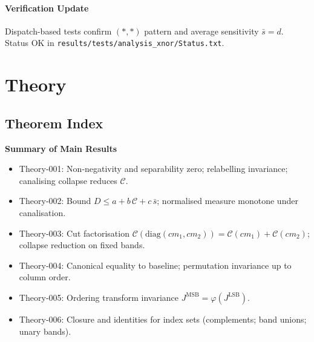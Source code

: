 \documentclass{article}
\begin{document}
\paragraph{Verification Update} Dispatch-based tests confirm \((* , *)\) pattern and average sensitivity \(\bar{s}=d\). Status OK in \texttt{results/tests/analysis\_xnor/Status.txt}.

\section{Theory}
\subsection*{Theorem Index}
\textbf{Summary of Main Results}\
\begin{itemize}
 \item Theory‑001: Non‑negativity and separability zero; relabelling invariance; canalising collapse reduces \(\mathcal{C}\).
 \item Theory‑002: Bound \(D \le a + b\,\mathcal{C} + c\,\bar{s}\); normalised measure monotone under canalisation.
 \item Theory‑003: Cut factorisation \(\mathcal{C}(\mathrm{diag}(cm_1,cm_2))=\mathcal{C}(cm_1)+\mathcal{C}(cm_2)\); collapse reduction on fixed bands.
 \item Theory‑004: Canonical equality to baseline; permutation invariance up to column order.
 \item Theory‑005: Ordering transform invariance \(J^{\mathrm{MSB}}=\varphi(J^{\mathrm{LSB}})\).
 \item Theory‑006: Closure and identities for index sets (complements; band unions; unary bands).
\end{itemize}
\end{document}
